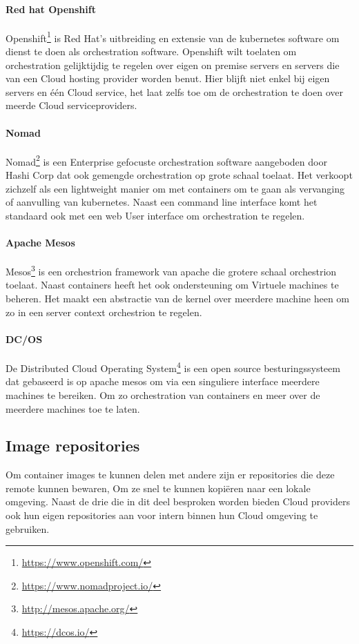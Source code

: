 \paragraph{Red hat Openshift}
Openshift\footnote{\url{https://www.openshift.com/}} is Red Hat’s uitbreiding en extensie van de kubernetes software om dienst te doen als orchestration software. Openshift wilt toelaten om orchestration gelijktijdig te regelen over eigen on premise servers en servers die van een Cloud hosting provider worden benut. Hier blijft niet enkel bij eigen servers en één Cloud service, het laat zelfs toe om de orchestration te doen over meerde Cloud serviceproviders.
\paragraph{Nomad}
Nomad\footnote{\url{https://www.nomadproject.io/}} is een Enterprise gefocuste orchestration software aangeboden door Hashi Corp dat ook gemengde orchestration op grote schaal toelaat. Het verkoopt zichzelf als een lightweight manier om met containers om te gaan als vervanging of aanvulling van kubernetes. Naast een command line interface komt het standaard ook met een web User interface om orchestration te regelen.
\paragraph{Apache Mesos}
Mesos\footnote{\url{http://mesos.apache.org/}} is een orchestrion framework van apache die grotere schaal orchestrion toelaat. Naast containers heeft het ook ondersteuning om Virtuele machines te beheren. Het maakt een abstractie van de kernel over meerdere machine heen om zo in een server context orchestrion te regelen.
\paragraph{DC/OS}
De Distributed Cloud Operating System\footnote{\url{https://dcos.io/}} is een open source besturingssysteem dat gebaseerd is op apache mesos om via een singuliere interface meerdere machines te bereiken. Om zo orchestration van containers en meer over de meerdere machines toe te laten.
\subsection{Image repositories}
Om container images te kunnen delen met andere zijn er repositories die deze remote kunnen bewaren, Om ze snel te kunnen kopiëren naar een lokale omgeving. Naast de drie die in dit deel besproken worden bieden Cloud providers ook hun eigen repositories aan voor intern binnen hun Cloud omgeving te gebruiken.
